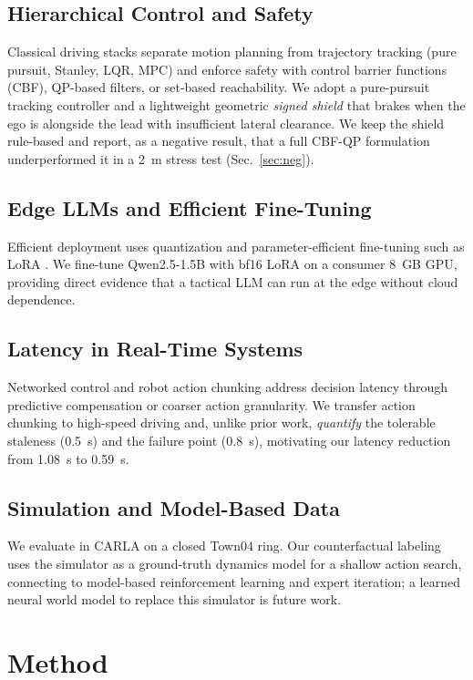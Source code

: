 \documentclass[conference]{IEEEtran}
\begin{document}
\subsection{Hierarchical Control and Safety}
Classical driving stacks separate motion planning from trajectory tracking
(pure pursuit, Stanley, LQR, MPC) and enforce safety with control barrier
functions (CBF), QP-based filters, or set-based reachability. We adopt a
pure-pursuit tracking controller and a lightweight geometric \emph{signed
shield} that brakes when the ego is alongside the lead with insufficient
lateral clearance. We keep the shield rule-based and report, as a negative
result, that a full CBF-QP formulation underperformed it in a 2~m stress test
(Sec.~\ref{sec:neg}).

\subsection{Edge LLMs and Efficient Fine-Tuning}
Efficient deployment uses quantization and parameter-efficient fine-tuning such
as LoRA \cite{hu2021lora}. We fine-tune Qwen2.5-1.5B \cite{qwen2025qwen25} with
bf16 LoRA on a consumer 8~GB GPU, providing direct evidence that a tactical LLM
can run at the edge without cloud dependence.

\subsection{Latency in Real-Time Systems}
Networked control and robot action chunking address decision latency through
predictive compensation or coarser action granularity. We transfer action
chunking to high-speed driving and, unlike prior work, \emph{quantify} the
tolerable staleness (0.5~s) and the failure point (0.8~s), motivating our
latency reduction from 1.08~s to 0.59~s.

\subsection{Simulation and Model-Based Data}
We evaluate in CARLA \cite{dosovitskiy2017carla} on a closed Town04 ring. Our
counterfactual labeling uses the simulator as a ground-truth dynamics model for
a shallow action search, connecting to model-based reinforcement learning and
expert iteration; a learned neural world model to replace this simulator is
future work.

\section{Method}
\end{document}
